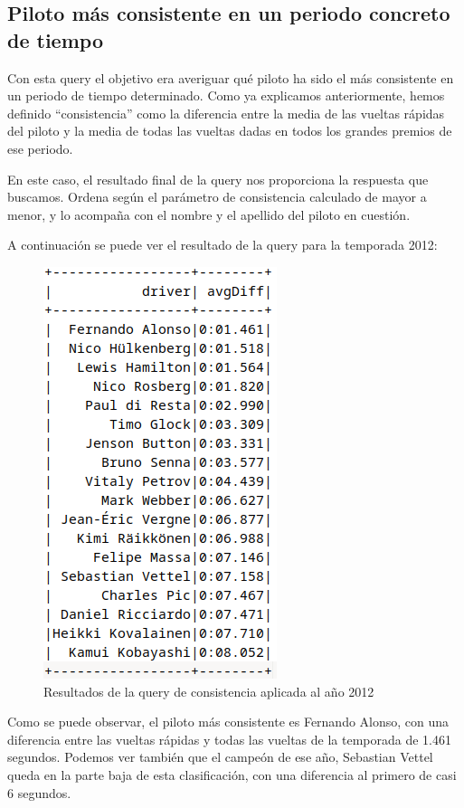 \documentclass[12pt,twoside,titlepage]{report}
\newcommand{\quotes}[1]{``#1''}
\begin{document}
\subsection{Piloto más consistente en un periodo concreto de tiempo}

Con esta query el objetivo era averiguar qué piloto ha sido el más consistente en un periodo de tiempo determinado. Como ya explicamos anteriormente, hemos definido \quotes{consistencia} como la diferencia entre la media de las vueltas rápidas del piloto y la media de todas las vueltas dadas en todos los grandes premios de ese periodo.

En este caso, el resultado final de la query nos proporciona la respuesta que buscamos. Ordena según el parámetro de consistencia calculado de mayor a menor, y lo acompaña con el nombre y el apellido del piloto en cuestión.

A continuación se puede ver el resultado de la query para la temporada 2012:

\begin{figure}[H]
	\includegraphics[scale=0.4]{results/consistency/2012consistency.png}
	\centering
	\caption{Resultados de la query de consistencia aplicada al año 2012}
	\label{fig:2012consistency}
	\centering
\end{figure}

Como se puede observar, el piloto más consistente es Fernando Alonso, con una diferencia entre las vueltas rápidas y todas las vueltas de la temporada de 1.461 segundos. Podemos ver también que el campeón de ese año, Sebastian Vettel queda en la parte baja de esta clasificación, con una diferencia al primero de casi 6 segundos.
\end{document}
